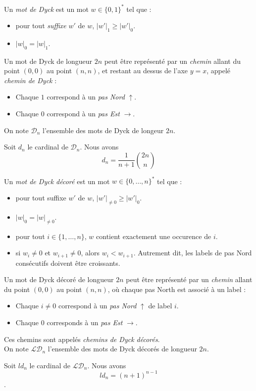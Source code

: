 \begin{definition}
    Un \emph{mot de Dyck} est un mot $w \in \{0,1\}^*$ tel que :
    \begin{itemize}
        \item pour tout \emph{suffixe} $w'$ de $w$,
            $|w'|_1 \geqslant |w'|_0$.
        \item $|w|_0 = |w|_1$.
    \end{itemize}
\end{definition}

Un mot de Dyck de longueur $2n$ peut être représenté par un \emph{chemin}
allant du point $(0,0)$ au point $(n,n)$, et restant au dessus de l'axe
$y = x$, appelé \emph{chemin de Dyck} :
\begin{itemize}
    \item Chaque $1$ correspond à un \emph{pas Nord}
    $\uparrow$. 
    \item Chaque $0$ correspond à un \emph{pas Est}
    $\rightarrow$.
\end{itemize}

On note $\mathcal{D}_n$ l'ensemble des mots de Dyck de longeur $2n$.

\begin{theorem}[André, 1887]
    Soit $d_n$ le cardinal de $\mathcal{D}_n$.
    Nous avons $$d_n = \frac{1}{n + 1} \binom {2n}{n}$$
\end{theorem}

\begin{definition}
    Un \emph{mot de Dyck décoré} est un mot $w \in 
    \{0, \ldots, n\}^*$ tel que :
    \begin{itemize}
        \item pour tout suffixe $w'$ de $w$,
            $|w'|_{\neq 0} \geqslant |w'|_0$.
        \item $|w|_0 = |w|_{\neq 0}$.
        \item pour tout $i \in \{1, \ldots, n\}$, $w$ contient
            exactement une occurence de $i$.
        \item si $w_i \neq 0$ et $w_{i+1} \neq 0$,
            alors $w_i < w_{i+1}$. Autrement dit, les labels de pas Nord
            consécutifs doivent être croissants.
    \end{itemize}
\end{definition}

Un mot de Dyck décoré de longueur $2n$ peut être représenté par un 
\emph{chemin} allant du point $(0,0)$ au point $(n,n)$, où chaque pas
North est associé à un label :
\begin{itemize}
    \item Chaque $i \neq 0$ correspond à un \emph{pas Nord} $\uparrow$
    de label $i$.
    \item Chaque $0$ corresponds à un \emph{pas Est} $\rightarrow$.
\end{itemize}

Ces chemins sont appelés \emph{chemins de Dyck décorés}.\\
On note $\mathcal{LD}_n$ l'ensemble des mots de Dyck décorés de longueur
$2n$.

\begin{theorem}
    Soit $ld_n$ le cardinal de $\mathcal{LD}_n$.
    Nous avons $$ld_n = (n + 1)^{n - 1}$$.
\end{theorem}